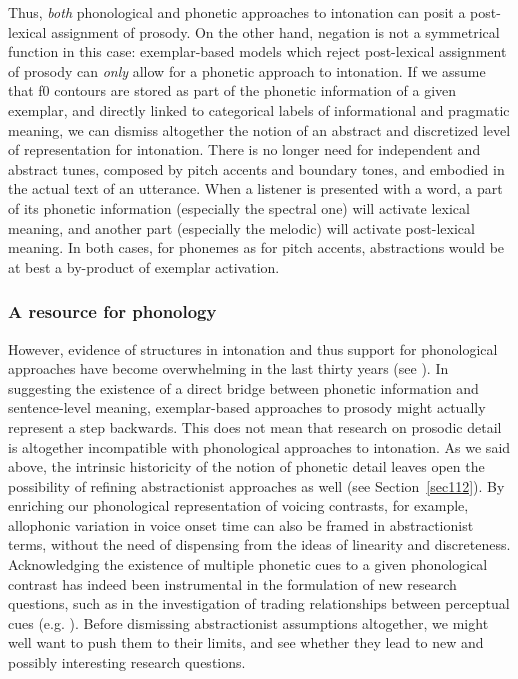 Thus, \textit{both} phonological and phonetic approaches to intonation can posit a post-lexical assignment of prosody. On the other hand, negation is not a symmetrical function in this case: exemplar-based models which reject post-lexical assignment of prosody can \textit{only} allow for a phonetic approach to intonation. If we assume that f0 contours are stored as part of the phonetic information of a given exemplar, and directly linked to categorical labels of informational and pragmatic meaning, we can dismiss altogether the notion of an abstract and discretized level of representation for intonation. There is no longer need for independent and abstract tunes, composed by pitch accents and boundary tones, and embodied in the actual text of an utterance. When a listener is presented with a word, a part of its phonetic information (especially the spectral one) will activate lexical meaning, and another part (especially the melodic) will activate post-lexical meaning. In both cases, for phonemes as for pitch accents, abstractions would be at best a by-product of exemplar activation. 

\subsubsection{A resource for phonology}\label{sec1132}
However, evidence of structures in intonation and thus support for phonological approaches have become overwhelming in the last thirty years (see ). In suggesting the existence of a direct bridge between phonetic information and sentence-level meaning, exemplar-based approaches to prosody might actually represent a step backwards. This does not mean that research on prosodic detail is altogether incompatible with phonological approaches to intonation. As we said above, the intrinsic historicity of the notion of phonetic detail leaves open the possibility of refining abstractionist approaches as well (see Section~\ref{sec112}). By enriching our phonological representation of voicing contrasts, for example, allophonic variation in voice onset time can also be framed in abstractionist terms, without the need of dispensing from the ideas of linearity and discreteness. Acknowledging the existence of multiple phonetic cues to a given phonological contrast has indeed been instrumental in the formulation of new research questions, such as in the investigation of trading relationships between perceptual cues (e.g. \citealt{repp1979relative}). Before dismissing abstractionist assumptions altogether, we might well want to push them to their limits, and see whether they lead to new and possibly interesting research questions.

